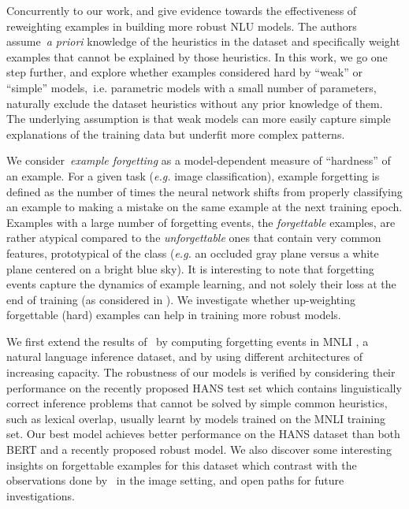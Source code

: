 Concurrently to our work,  and  give evidence towards the effectiveness of reweighting examples in building more robust NLU models. The authors assume~\emph{a priori} knowledge of the heuristics in the dataset and specifically weight examples that cannot be explained by those heuristics. In this work, we go one step further, and explore whether examples considered hard by ``weak'' or ``simple'' models,~i.e. parametric models with a small number of parameters, naturally exclude the dataset heuristics without any prior knowledge of them. The underlying assumption is that weak models can more easily capture simple explanations of the training data but underfit more complex patterns.

We consider~\emph{example forgetting} \cite{toneva2018empirical} as a model-dependent measure of ``hardness'' of an example. For a given task (\textit{e.g.} image classification), example forgetting is defined as the number of times the neural network shifts from properly classifying an example to making a mistake on the same example at the next training epoch. Examples with a large number of forgetting events, the \emph{forgettable} examples, are rather atypical compared to the \emph{unforgettable} ones that contain very common features, prototypical of the class (\textit{e.g.} an occluded gray plane versus a white plane centered on a bright blue sky). It is interesting to note that forgetting events capture the dynamics of example learning, and not solely their loss at the end of training (as considered in ). We investigate whether up-weighting forgettable (hard) examples can help in training more robust models.  

We first extend the results of~\cite{toneva2018empirical} by computing forgetting events in MNLI \cite{williams2017broad}, a natural language inference dataset, and by using different architectures of increasing capacity. The robustness of our models is verified by considering their performance on the recently proposed HANS test set \cite{linzen2019right} which contains linguistically correct inference problems that cannot be solved by simple common heuristics, such as lexical overlap, usually learnt by models trained on the MNLI training set. Our best model achieves better performance on the HANS dataset than both BERT and a recently proposed robust model. We also discover some interesting insights on forgettable examples for this dataset which contrast with the observations done by~\cite{toneva2018empirical} in the image setting, and open paths for future investigations.

 


